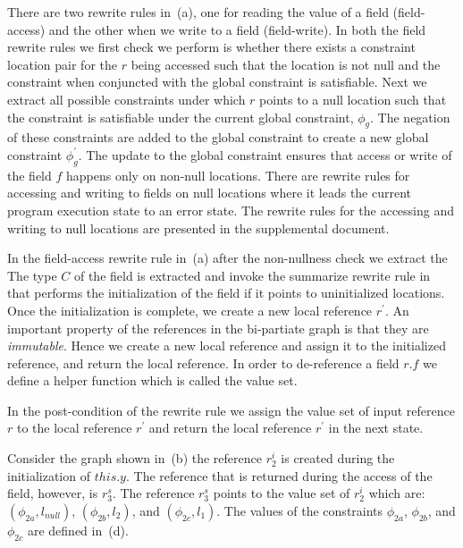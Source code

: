 There are two rewrite rules in~(a), one for reading
the value of a field (field-access) and the other when we write to a
field (field-write). In both the field rewrite rules we first check we
perform is whether there exists a constraint location pair for the $r$
being accessed such that the location is not null and the constraint
when conjuncted with the global constraint is satisfiable. Next we
extract all possible constraints under which $r$ points to a null
location such that the constraint is satisfiable under the current
global constraint, $\phi_g$. The negation of these constraints are
added to the global constraint to create a new global constraint
$\phi_g^\prime$. The update to the global constraint ensures that
access or write of the field $f$ happens only on non-null
locations. There are rewrite rules for accessing and writing to fields
on null locations where it leads the current program execution state
to an error state. The rewrite rules for the accessing and writing to
null locations are presented in the supplemental document.

In the field-access rewrite rule in~(a) after the
non-nullness check we extract the The type $C$ of the field is
extracted and invoke the summarize rewrite rule
in~ that performs the initialization of the field
if it points to uninitialized locations. Once the initialization is
complete, we create a new local reference $r^\prime$. An important
property of the references in the bi-partiate graph is that they are
\emph{immutable}. Hence we create a new local reference and assign it
to the initialized reference, and return the local reference. In order
to de-reference a field $r.f$ we define a helper function which is
called the value set.



In the post-condition of the rewrite rule we assign
the value set of input reference $r$ to the local reference $r^\prime$
and return the local reference $r^\prime$ in the next state.

Consider the graph shown in~(b) the reference
$r_2^i$ is created during the initialization of $\mathit{this}.y$. The
reference that is returned during the access of the field, however, is
$r_3^s$. The reference $r_3^s$ points to the value set of $r_2^i$
which are: $(\phi_{2a}, l_\mathit{null})$, $(\phi_{2b}, l_2)$, and
$(\phi_{2c}, l_1)$. The values of the constraints $\phi_{2a}$,
$\phi_{2b}$, and $\phi_{2c}$ are defined in~(d).

